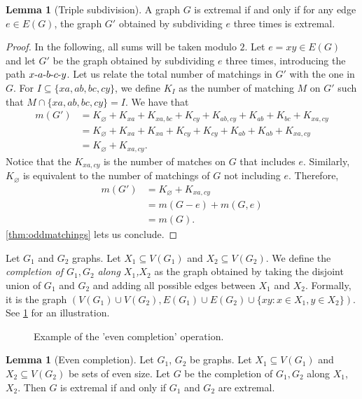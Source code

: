 \documentclass{amsart}
\def\dd{\hbox{-}}
\theoremstyle{definition}
\newtheorem{lemma}[theorem]{Lemma}
\theoremstyle{remark}
\begin{document}
\begin{lemma}[Triple subdivision]\label{triple subdivision}
    A graph $G$ is extremal if and only if for any edge $e\in E(G)$, the graph $G'$ obtained by subdividing $e$ three times is extremal.    
\end{lemma}
\begin{proof} In the following, all sums will be taken modulo $2$.
    Let $e=xy\in E(G)$ and let $G'$ be the graph obtained by subdividing $e$ three times, introducing the path $x\dd a\dd b\dd c\dd y$. Let us relate the total number of matchings in $G'$ with the one in $G$. 
    For $I\subseteq\{xa,ab,bc,cy\}$, we define $K_I$ as the number of matching $M$ on $G'$ such that $M\cap \{xa,ab,bc,cy\} = I$. We have that
    \begin{align*}
        m(G') &= K_\varnothing + K_{xa}+ K_{xa,bc} + K_{cy}+ K_{ab,cy} + K_{ab} +  K_{bc} + K_{xa,cy}\\
        &= K_\varnothing + K_{xa}+ K_{xa} + K_{cy}+ K_{cy} + K_{ab} +  K_{ab} + K_{xa,cy}\\
        &= K_\varnothing + K_{xa,cy}.
    \end{align*} 
    Notice that the $K_{xa,cy}$ is the number of matches on $G$ that includes $e$. Similarly, $K_\varnothing$ is equivalent to the number of matchings of $G$ not including $e$. Therefore, \begin{align*}
        m(G') &=K_\varnothing + K_{xa,cy}\\
        &= m(G-e) + m(G,e)\\
        &=  m(G).
    \end{align*}
    \cref{thm:oddmatchings} lets us conclude.
\end{proof}

Let $G_1$ and $G_2$ graphs. Let $X_1\subseteq V(G_1)$ and $X_2\subseteq V(G_2)$. We define the \textit{completion of $G_1,G_2$ along $X_1$,$X_2$} as the graph obtained by taking the disjoint union of $G_1$ and $G_2$ and adding all possible edges between $X_1$ and $X_2$. Formally, it is the graph $(V(G_1)\cup V(G_2), E(G_1)\cup E(G_2) \cup \{xy : x\in X_1, y\in X_2 \})$. See \cref{fig: even completion} for an illustration.
\begin{figure}[h]
    \centering
    \caption{Example of the 'even completion' operation.}
    \label{fig: even completion}
\end{figure}

\begin{lemma}[Even completion]
    Let $G_1$, $G_2$ be graphs. Let $X_1\subseteq V(G_1)$ and $X_2\subseteq V(G_2)$ be sets of even size. Let $G$ be the completion of $G_1,G_2$ along $X_1$,$X_2$.
    Then $G$ is extremal if and only if $G_1$ and $G_2$ are extremal.
\end{lemma}
\end{document}
